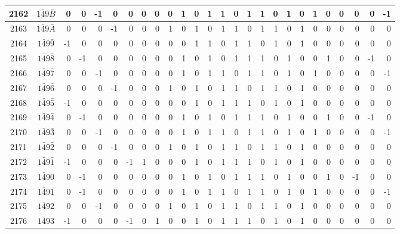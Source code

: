 \documentclass[12 pt]{article}%
\begin{document}
\begin{tiny}
\begin{centering}
\begin{longtable}{|c|c||rrrrrrrrrrrrrrrrrrrrrrrr|}
      \hline
      2162 & $1\bar49\bar B$ & 0 & 0 & -1 & 0 & 0 & 0 & 0 & 0 & 1 & 0 & 1 & 1 & 0 & 1 & 1 & 0 & 1 & 0 & 1 & 0 & 0 & 0 & 0 & -1 \\
      \hline
      2163 & $1\bar49\bar A$ & 0 & 0 & 0 & -1 & 0 & 0 & 0 & 1 & 0 & 1 & 0 & 1 & 1 & 0 & 1 & 1 & 0 & 1 & 0 & 0 & 0 & 0 & 0 & 0 \\
      \hline
      2164 & $1\bar49\bar9$ & -1 & 0 & 0 & 0 & 0 & 0 & 0 & 0 & 0 & 1 & 1 & 0 & 1 & 1 & 0 & 1 & 0 & 1 & 0 & 0 & 0 & 0 & 0 & 0 \\
      \hline
      2165 & $1\bar49\bar8$ & 0 & -1 & 0 & 0 & 0 & 0 & 0 & 0 & 1 & 0 & 1 & 0 & 1 & 1 & 1 & 0 & 1 & 0 & 0 & 1 & 0 & 0 & -1 & 0 \\
      \hline
      2166 & $1\bar49\bar7$ & 0 & 0 & -1 & 0 & 0 & 0 & 0 & 0 & 1 & 0 & 1 & 1 & 0 & 1 & 1 & 0 & 1 & 0 & 1 & 0 & 0 & 0 & 0 & -1 \\
      \hline
      2167 & $1\bar49\bar6$ & 0 & 0 & 0 & -1 & 0 & 0 & 0 & 1 & 0 & 1 & 0 & 1 & 1 & 0 & 1 & 1 & 0 & 1 & 0 & 0 & 0 & 0 & 0 & 0 \\
      \hline
      2168 & $1\bar49\bar5$ & -1 & 0 & 0 & 0 & 0 & 0 & 0 & 0 & 0 & 1 & 0 & 1 & 1 & 1 & 0 & 1 & 0 & 1 & 0 & 0 & 0 & 0 & 0 & 0 \\
      \hline
      2169 & $1\bar49\bar4$ & 0 & -1 & 0 & 0 & 0 & 0 & 0 & 0 & 1 & 0 & 1 & 0 & 1 & 1 & 1 & 0 & 1 & 0 & 0 & 1 & 0 & 0 & -1 & 0 \\
      \hline
      2170 & $1\bar49\bar3$ & 0 & 0 & -1 & 0 & 0 & 0 & 0 & 0 & 1 & 0 & 1 & 1 & 0 & 1 & 1 & 0 & 1 & 0 & 1 & 0 & 0 & 0 & 0 & -1 \\
      \hline
      2171 & $1\bar49\bar2$ & 0 & 0 & 0 & -1 & 0 & 0 & 0 & 1 & 0 & 1 & 0 & 1 & 1 & 0 & 1 & 1 & 0 & 1 & 0 & 0 & 0 & 0 & 0 & 0 \\
      \hline
      2172 & $1\bar49\bar1$ & -1 & 0 & 0 & 0 & -1 & 1 & 0 & 0 & 0 & 1 & 0 & 1 & 1 & 1 & 0 & 1 & 0 & 1 & 0 & 0 & 0 & 0 & 0 & 0 \\
      \hline
      2173 & $1\bar490$ & 0 & -1 & 0 & 0 & 0 & 0 & 0 & 0 & 1 & 0 & 1 & 0 & 1 & 1 & 1 & 0 & 1 & 0 & 0 & 1 & 0 & -1 & 0 & 0 \\
      \hline
      2174 & $1\bar491$ & 0 & -1 & 0 & 0 & 0 & 0 & 0 & 0 & 1 & 0 & 1 & 1 & 0 & 1 & 1 & 0 & 1 & 0 & 1 & 0 & 0 & 0 & 0 & -1 \\
      \hline
      2175 & $1\bar492$ & 0 & 0 & -1 & 0 & 0 & 0 & 0 & 1 & 0 & 1 & 0 & 1 & 1 & 0 & 1 & 1 & 0 & 1 & 0 & 0 & 0 & 0 & 0 & 0 \\
      \hline
      2176 & $1\bar493$ & -1 & 0 & 0 & 0 & -1 & 0 & 1 & 0 & 0 & 1 & 0 & 1 & 1 & 1 & 0 & 1 & 0 & 1 & 0 & 0 & 0 & 0 & 0 & 0 \\

\end{longtable}
\end{centering}
\end{tiny}
\end{document}
